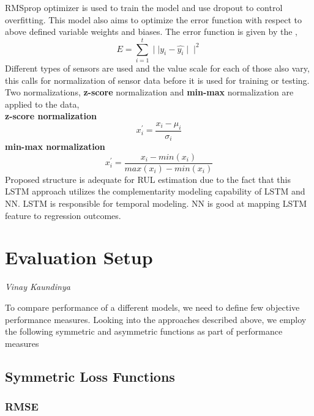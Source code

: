 RMSprop optimizer is used to train the model and use dropout to control overfitting. This model also aims to optimize the error function with respect to above defined variable weights and biases. The error function is given by the ,
\begin{equation}
    E = \sum_{i=1}^{t} \mid \mid y_i - \hat{y_i} \mid \mid^2
\end{equation}
Different types of sensors are used and the value scale for each of those also vary, this calls for normalization of sensor data before it is used for training or testing. Two normalizations, \textbf{z-score} normalization and \textbf{min-max} normalization are applied to the data,\\
\textbf{z-score normalization}
\begin{equation}
    x_i^\prime = \frac{x_i - \mu_i}{\sigma_i}
\end{equation}
\textbf{min-max normalization}
\begin{equation}
    x_i^\prime = \frac{x_i - min(x_i)}{max(x_i)-min(x_i)}
\end{equation}
Proposed structure is adequate for RUL estimation due to the fact that this LSTM approach \cite{DBLP:conf/icphm/ZhengRFG17} utilizes the complementarity modeling capability of LSTM and NN. LSTM is responsible for temporal modeling. NN is good at mapping LSTM feature to regression outcomes.

\section{Evaluation Setup}
\vspace*{-12.5mm}\hfill{\normalsize\emph{Vinay Kaundinya}}
\label{sec:rul_estimation:evaluation_setup}

To compare performance of a different models, we need to define few objective performance measures. Looking into the approaches described above, we employ the following symmetric and asymmetric functions as part of performance measures

\subsection{Symmetric Loss Functions}
\label{sec:rul_estimation:evaluation_setup:sym_loss}

\subsubsection*{RMSE}

